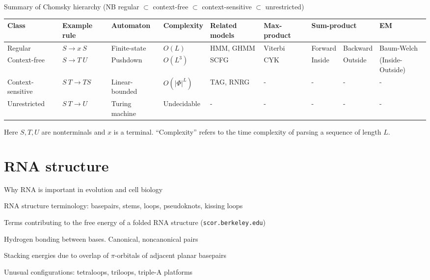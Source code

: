 \documentclass{beamer}
\begin{document}
\begin{frame}{}
\itemb
\item Summary of Chomsky hierarchy (NB regular $\subset$ context-free $\subset$ context-sensitive $\subset$ unrestricted)
\\
\small
\begin{tabular}{lllllllll}
Class & Example rule & Automaton & Complexity & Related models & Max-product & \multicolumn{2}{l}{Sum-product} & EM \\
\hline
Regular & $S \to x\ S$ & Finite-state & $O(L)$ & HMM, GHMM & Viterbi & Forward & Backward & Baum-Welch \\
Context-free & $S \to T\ U$ & Pushdown & $O(L^3)$ & SCFG & CYK & Inside & Outside & (Inside-Outside) \\
Context-sensitive & $S\ T \to T S$ & Linear-bounded & $O(|\Phi|^L)$ & TAG, RNRG & - & - & - & - \\
Unrestricted & $S\ T \to U$ & Turing machine & Undecidable & - & - & - & - & -
\end{tabular}
\normalsize
Here $S,T,U$ are nonterminals and $x$ is a terminal.
``Complexity'' refers to the time complexity of parsing a sequence of length $L$.
\iteme

\end{frame}

\section{RNA structure}

\begin{frame}{}

\itemb
\item Why RNA is important in evolution and cell biology
\iteme
\end{frame}

\begin{frame}{}

\itemb
\item RNA structure terminology: basepairs, stems, loops, pseudoknots, kissing loops
\iteme
\end{frame}

\begin{frame}{}

Terms contributing to the free energy of a folded RNA structure ({\tt scor.berkeley.edu})
 \itemb
 \item Hydrogen bonding between bases. Canonical, noncanonical pairs
 \item Stacking energies due to overlap of $\pi$-orbitals of adjacent planar basepairs
 \item Unusual configurations: tetraloops, triloops, triple-A platforms
\iteme
\end{frame}
\end{document}
